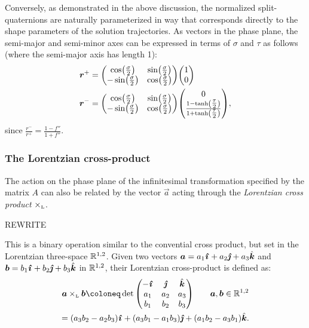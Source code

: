 Conversely, as demonstrated in the above discussion, the normalized split-quaternions are naturally parameterized in way that corresponds directly to the shape parameters of the solution trajectories. As vectors in the phase plane, the semi-major and semi-minor axes can be expressed in terms of \(\sigma\) and \(\tau\) as follows (where the semi-major axis has length 1):
\begin{equation}
    \begin{split}
        \vec{r}^+ &= \mqty(\cos(\tfrac{\sigma}{2}) & \sin(\tfrac{\sigma}{2}) \\ -\sin(\tfrac{\sigma}{2}) & \cos(\tfrac{\sigma}{2}))\mqty(1 \\ 0 ) \\
        \vec{r}^- &= \mqty(\cos(\tfrac{\sigma}{2}) & \sin(\tfrac{\sigma}{2}) \\ -\sin(\tfrac{\sigma}{2}) & \cos(\tfrac{\sigma}{2}))\mqty( 0 \\ \frac{1 - \tanh(\tfrac{\tau}{2})}{1 + \tanh(\tfrac{\tau}{2})}), \\
    \end{split}
    \label{eq:major_axes}
\end{equation}
since \(\displaystyle \frac{r^-}{r^+} = \frac{1 - f''}{1 + f''}\).

\subsubsection{The Lorentzian cross-product}
The action on the phase plane of the infinitesimal transformation specified by the matrix \(A\) can also be related by the vector \(\vec{a}\) acting through the \emph{Lorentzian cross product} \(\times_\text{\tiny{L}} \). 

REWRITE

This is a binary operation similar to the convential cross product, but set in the Lorentzian three-space \(\mathbb{R}^{1, 2}\). Given two vectors \(\vec{a} = a_1\quati + a_2\quatj + a_3\quatk\) and \(\vec{b} = b_1\quati + b_2\quatj + b_3\quatk\) in \(\mathbb{R}^{1, 2}\), their Lorentzian cross-product is defined as: \cite{Jafari2014}
\begin{gather}
        \lorcrossp{\vec{a}}{\vec{b}} \coloneq \det\mqty(-\quati & \quatj & \quatk \\ a_1 & a_2 & a_3 \\ b_1 & b_2 & b_3) \qquad \vec{a}, \vec{b} \in \real^{1, 2} \\
            = \qty(a_3b_2 - a_2b_3)\quati + \qty(a_3b_1 - a_1b_3)\quatj + \qty(a_1b_2 - a_3b_1)\quatk.
\end{gather}

